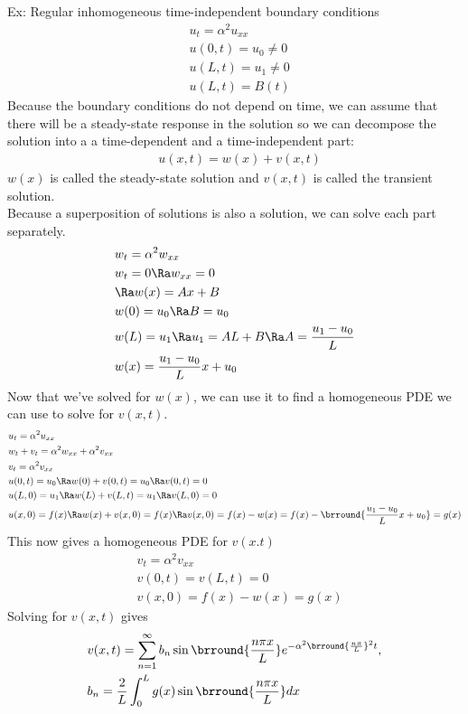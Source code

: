 Ex: Regular inhomogeneous time-independent boundary conditions
\begin{align*}
    &u_t=\alpha^2u_{xx}\\
    &u(0,t)=u_0\neq0\\
    &u(L,t)=u_1\neq0\\
    &u(L,t)=B(t)
\end{align*}
Because the boundary conditions do not depend on time, we can assume that there will be a steady-state response in the solution so we can decompose the solution into a a time-dependent and a time-independent part:
\begin{align*}
    &u(x,t)=w(x)+v(x,t)
\end{align*}
$w(x)$ is called the steady-state solution and $v(x,t)$ is called the transient solution.\\
Because a superposition of solutions is also a solution, we can solve each part separately.
\begin{align*}
    &w_t=\alpha^2 w_{xx}\\
    &w_t=0\Ra w_{xx}=0\\
    &\Ra w(x)=Ax+B\\
    &w(0)=u_0\Ra B=u_0\\
    &w(L)=u_1\Ra u_1=AL+B\Ra A=\frac{u_1-u_0}{L}\\
    &w(x)=\frac{u_1-u_0}{L}x+u_0
\end{align*}
Now that we've solved for $w(x)$, we can use it to find a homogeneous PDE we can use to solve for $v(x,t)$.
\begin{align*}
    &u_t=\alpha^2u_{xx}\\
    &w_t+v_t=\alpha^2w_{xx}+\alpha^2v_{xx}\\
    &v_t=\alpha^2v_{xx}\\
    &u(0,t)=u_0\Ra w(0)+v(0,t)=u_0\Ra v(0,t)=0\\
    &u(L,0)=u_1\Ra w(L)+v(L,t)=u_1\Ra v(L,0)=0\\
    &u(x,0)=f(x)\Ra w(x)+v(x,0)=f(x)\Ra v(x,0)=f(x)-w(x)=f(x)-\brround{\frac{u_1-u_0}{L}x+u_0}=g(x)
\end{align*}
This now gives a homogeneous PDE for $v(x.t)$
\begin{align*}
    &v_t=\alpha^2v_{xx}\\
    &v(0,t)=v(L,t)=0\\
    &v(x,0)=f(x)-w(x)=g(x)
\end{align*}
Solving for $v(x,t)$ gives
\begin{align*}
    &v(x,t)=\sum_{n=1}^\infty b_n\sin\brround{\frac{n\pi x}{L}}e^{-\alpha^2\brround{\frac{n\pi}{L}}^2t},\\
    &b_n=\frac{2}{L}\int_0^L g(x)\sin\brround{\frac{n\pi x}{L}}dx
\end{align*}
